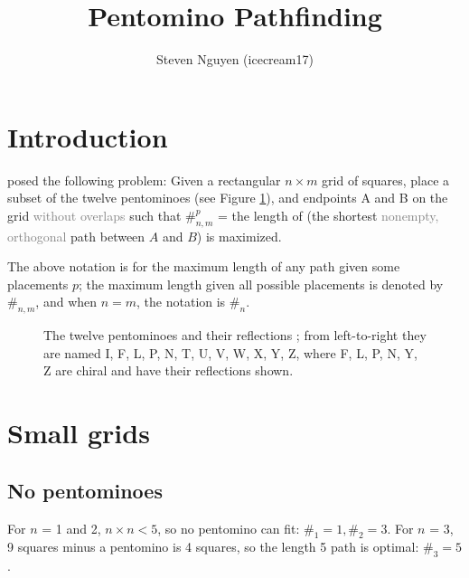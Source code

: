 \documentclass{article}
\title{Pentomino Pathfinding}
\author{Steven Nguyen (icecream17)}
\theoremstyle{definition} %
\newcommand{\minordetail}[1]{\textcolor{gray}{#1}}
\begin{document}
\maketitle


\tableofcontents





\section{Introduction}

\cite{v1} posed the following problem: Given a rectangular $n \times m$ grid of squares, place a subset of the twelve pentominoes (see Figure \ref{fig:pentominoes}), and endpoints A and B on the grid \minordetail{without overlaps} such that $\#^{p}_{n, m}$ = the length of (the shortest \minordetail{nonempty, orthogonal} path between $A$ and $B$) is maximized.

The above notation is for the maximum length of any path given some placements $p$; the maximum length given all possible placements is denoted by $\#_{n, m}$, and when $n = m$, the notation is $\#_n$.

\begin{figure}[!h]
    \centering
    
    \caption{The twelve pentominoes and their reflections \cite{pentominoes};
    from left-to-right they are named I, F, L, P, N, T, U, V, W, X, Y, Z,
    where F, L, P, N, Y, Z are chiral and have their reflections shown.}
    \label{fig:pentominoes}
\end{figure}






\section{Small grids}

\subsection{No pentominoes}

For $n$ = 1 and 2, $n \times n < 5$, so no pentomino can fit: $\#_1 = 1, \#_2 = 3$.
For $n$ = 3, 9 squares minus a pentomino is 4 squares, so the length 5 path is optimal: $\#_3 = 5$.%
\end{document}
